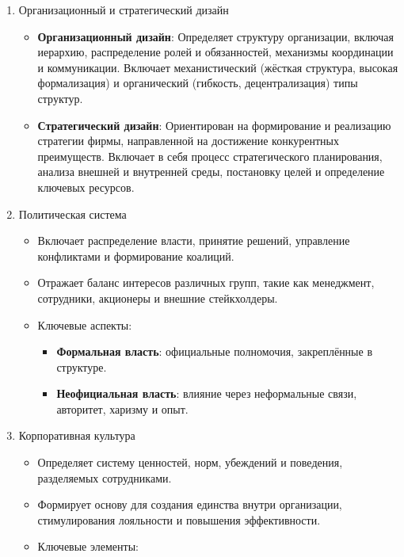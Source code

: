 \begin{enumerate}
    \item Организационный и стратегический дизайн
        \begin{itemize}
            \item \textbf{Организационный дизайн}: 
            Определяет структуру организации, включая иерархию, распределение ролей и обязанностей, механизмы координации и коммуникации. Включает механистический (жёсткая структура, высокая формализация) и органический (гибкость, децентрализация) типы структур.
            \item \textbf{Стратегический дизайн}: 
            Ориентирован на формирование и реализацию стратегии фирмы, направленной на достижение конкурентных преимуществ. Включает в себя процесс стратегического планирования, анализа внешней и внутренней среды, постановку целей и определение ключевых ресурсов.
        \end{itemize}
    \item Политическая система
        \begin{itemize}
            \item Включает распределение власти, принятие решений, управление конфликтами и формирование коалиций.
            \item Отражает баланс интересов различных групп, такие как менеджмент, сотрудники, акционеры и внешние стейкхолдеры.
            \item Ключевые аспекты: 
            \begin{itemize}
                \item \textbf{Формальная власть}: официальные полномочия, закреплённые в структуре.
                \item \textbf{Неофициальная власть}: влияние через неформальные связи, авторитет, харизму и опыт.
            \end{itemize}
        \end{itemize}
    \item Корпоративная культура
        \begin{itemize}
            \item Определяет систему ценностей, норм, убеждений и поведения, разделяемых сотрудниками.
            \item Формирует основу для создания единства внутри организации, стимулирования лояльности и повышения эффективности.
            \item Ключевые элементы:
            \begin{itemize}

\end{itemize}
\end{itemize}
\end{enumerate}
